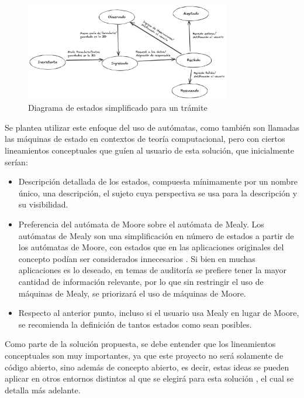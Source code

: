 \begin{figure}[ht]
	\centering
	\includegraphics[width=0.8\textwidth]{assets/stateprocedureexample}
	\caption{Diagrama de estados simplificado para un trámite}
	\label{fig:states_procedure}
\end{figure}

Se plantea utilizar este enfoque del uso de autómatas, como también son llamadas
las máquinas de estado en contextos de teoría computacional, pero con ciertos
lineamientos conceptuales que guíen al usuario de esta solución, que
inicialmente serían:

\begin{itemize}
	\item Descripción detallada de los estados, compuesta mínimamente por un
		nombre único, una descripción, el sujeto cuya perspectiva se usa para la
		descripción y su visibilidad.

	\item Preferencia del autómata de Moore sobre el autómata de Mealy. Los
		autómatas de Mealy son una simplificación en número de estados a partir
		de los autómatas de Moore, con estados que en las aplicaciones
		originales del concepto podían ser considerados innecesarios
		\parencite{mealyMethodSynthesizingSequential1955}.  Si bien en muchas
		aplicaciones es lo deseado, en temas de auditoría se prefiere tener la
		mayor cantidad de información relevante, por lo que sin restringir el
		uso de máquinas de Mealy, se priorizará el uso de máquinas de Moore.

	\item Respecto al anterior punto, incluso si el usuario usa Mealy en lugar
		de Moore, se recomienda la definición de tantos estados como sean
		posibles.
	
\end{itemize}

Como parte de la solución propuesta, se debe entender que los lineamientos
conceptuales son muy importantes, ya que este proyecto no será solamente de
código abierto, sino además de concepto abierto, es decir, estas ideas se pueden
aplicar en otros entornos distintos al que se elegirá para esta solución
\cite[439]{sommervilleSoftwareEngineering2016}, el cual se detalla más adelante.

